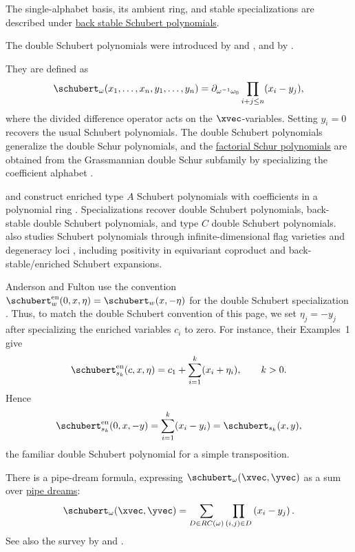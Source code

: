 The single-alphabet basis, its ambient ring, and stable specializations are
described under \hyperref[backStableSchubert]{back stable Schubert polynomials}.

The double Schubert polynomials were introduced by
 and 
\cite{LascouxSchutzenberger1982}, and by  \cite{Macdonald1991}.

They are defined as
\begin{equation*}
 \schubert_\omega(x_1,\dotsc,x_n,y_1,\dotsc,y_n)
 =
 \partial_{\omega^{-1}\omega_0} \prod_{i + j \leq n} (x_i-y_j),
\end{equation*}
where the divided difference operator acts on the $\xvec$-variables.
Setting $y_i=0$ recovers the usual Schubert polynomials.
The double Schubert polynomials generalize the double Schur polynomials, and
the \hyperref[schurFactorial]{factorial Schur polynomials} are obtained from
the Grassmannian double Schur subfamily by specializing the coefficient
alphabet \cite{ChenLiLouck2002}.

 and  construct enriched type $A$
Schubert polynomials with coefficients in a polynomial ring
\cite{AndersonFulton2021x}.  Specializations recover double Schubert
polynomials, back-stable double Schubert polynomials, and type $C$ double
Schubert polynomials.   also studies Schubert
polynomials through infinite-dimensional flag varieties and degeneracy loci
\cite{Anderson2025}, including positivity in equivariant coproduct and
back-stable/enriched Schubert expansions.

\begin{example}
Anderson and Fulton use the convention
$\schubert^{\mathrm{en}}_w(0,x,\eta)=\schubert_w(x,-\eta)$ for the double
Schubert specialization \cite[Thm.~1.1]{AndersonFulton2021x}.  Thus, to match
the double Schubert convention of this page, we set $\eta_j=-y_j$ after
specializing the enriched variables $c_i$ to zero.  For instance, their
Examples~1 give
\[
  \schubert^{\mathrm{en}}_{s_k}(c,x,\eta)
  =
  c_1+\sum_{i=1}^k (x_i+\eta_i),
  \qquad k>0.
\]
Hence
\[
  \schubert^{\mathrm{en}}_{s_k}(0,x,-y)
  =
  \sum_{i=1}^k (x_i-y_i)
  =
  \schubert_{s_k}(x,y),
\]
the familiar double Schubert polynomial for a simple transposition.
\end{example}

There is a pipe-dream formula, expressing $\schubert_\omega(\xvec,\yvec)$
as a sum over \hyperref[schubertPipeDream]{pipe dreams}:
\begin{equation*}
 \schubert_\omega(\xvec,\yvec) = \sum_{D \in RC(\omega) } \prod_{(i,j) \in D} \left(x_{i} - y_{j} \right).
\end{equation*}
See also the survey by  and  \cite{BergeronBilley1993}.

